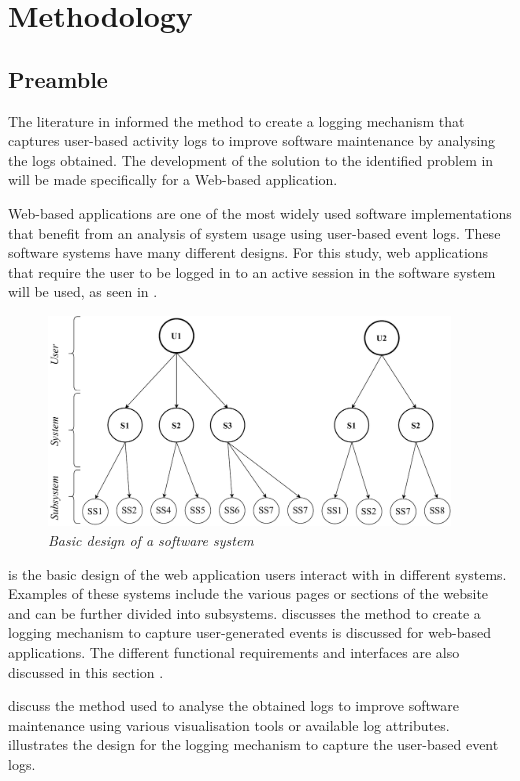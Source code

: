 \chapter{Methodology}
\label{chap:2}

\section{Preamble}\label{sec:ch2_preamble}
 The literature in  informed the method to create a logging mechanism that captures user-based activity logs to improve software maintenance by analysing the logs obtained. The development of the solution to the identified problem in  will be made specifically for a Web-based application.\par Web-based applications are one of the most widely used software implementations that benefit from an analysis of system usage using user-based event logs. These software systems have many different designs. For this study, web applications that require the user to be logged in to an active session in the software system will be used, as seen in .

 \begin{figure}[!htb]
	\centering %
	\includegraphics[width=0.95\textwidth]{img/Chapter2/systemOverview/systemOverview.pdf}
	\caption[Basic design of a software system]
	{\textit{Basic design of a software system}}\label{fig:ch2_webSystemBasic}
\end{figure}
 
 is the basic design of the web application users interact with in different systems. Examples of these systems include the various pages or sections of the website and can be further divided into subsystems.  discusses the method to create a logging mechanism to capture user-generated events is discussed for web-based applications. The different functional requirements and interfaces are also discussed in this section \cite{Anish2015}. \par {} discuss the method used to analyse the obtained logs to improve software maintenance using various visualisation tools or available log attributes.  illustrates the design for the logging mechanism to capture the user-based event logs.

